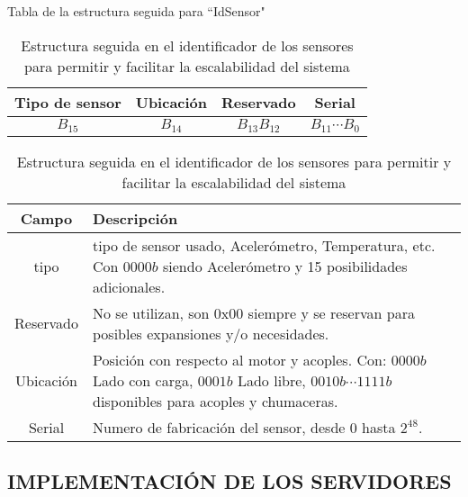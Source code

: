     \begin{table}[ht]
        \begin{center}
            Tabla de la estructura seguida para ``IdSensor"\  \\

            \vspace{0.3cm}
            \begin{tabular}{|c|c|c|c|}
                \hline
                Tipo de sensor & Ubicación & Reservado  & Serial \\\hline
                $ B_{15} $ & $ B_{14} $  & $ B_{13}B_{12} $ & $ B_{11}\cdots B_{0} $\\
                \hline
            \end{tabular}

            \vspace{0.3cm}
            \begin{tabular}{|c|p{13cm}|}
                \hline
                Campo       & Descripción
                \\\hline\hline
                tipo        & tipo de sensor usado, Acelerómetro, Temperatura, etc.
                Con $0000b$ siendo Acelerómetro y 15 posibilidades adicionales.
                \\\hline
                Reservado   & No se utilizan, son 0x00 siempre y se reservan para
                posibles expansiones y/o necesidades.
                \\\hline
                Ubicación   & Posición con respecto al motor y acoples. Con:
                $0000b$ Lado con carga, $ 0001b$ Lado libre, $ 0010b\cdots1111b $
                disponibles para acoples y chumaceras.
                \\\hline
                Serial      & Numero de fabricación del sensor, desde 0 hasta $2^{48}$.
                \\\hline
            \end{tabular}
        \end{center}
        \caption[Estructura IdSensor]{Estructura seguida en el identificador de
        los sensores para permitir y facilitar la escalabilidad del sistema}
        \label{tab:CodIdSensor}
    \end{table}


 \newpage
\subsection{IMPLEMENTACIÓN DE LOS SERVIDORES}

